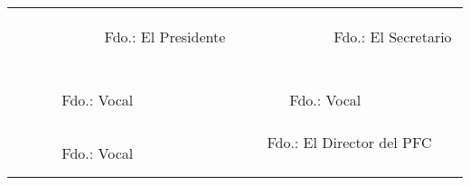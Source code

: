 \begin{center}
\begin{tabular}{cc}
& \\
& \\
& \\
\ \ \ \ \ \ \ \ \ \ \ \
Fdo.: El Presidente
\ \ \ \ \ \ \ \ \ \ \ \ &
\ \ \ \ \ \ \ \ \ \ \ \
Fdo.: El Secretario
\ \ \ \ \ \ \ \ \ \ \ \ \\
& \\
& \\
& \\
Fdo.: Vocal \ \ \ \ \ \          &         Fdo.: Vocal \ \ \ \ \ \ \\
& \\
& \\
& \\
Fdo.: Vocal \ \ \ \ \ \          &         Fdo.: El Director del PFC \ \ \ \ \ \  \\
\end{tabular}
\end{center}

\thispagestyle{empty} \

